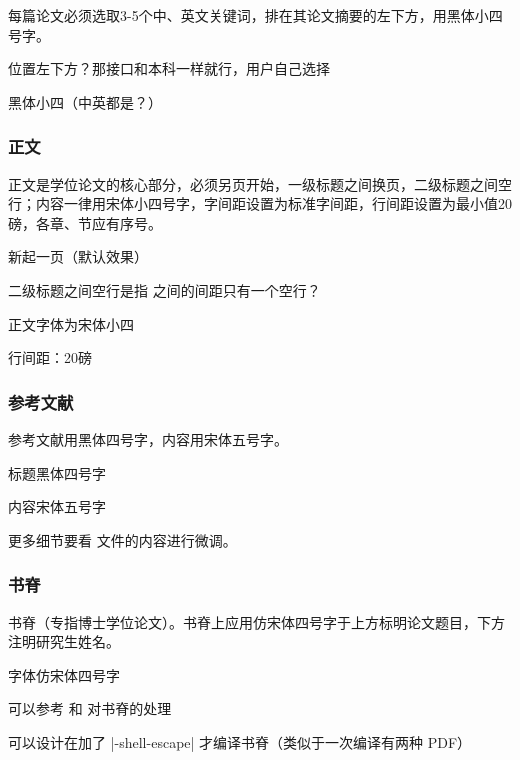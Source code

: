 \begin{reference}
  每篇论文必须选取3-5个中、英文关键词，排在其论文摘要的左下方，用黑体小四号字。
\end{reference}

\begin{points}
  \item 位置左下方？那接口和本科一样就行，用户自己选择
  \item 黑体小四（中英都是？）
\end{points}


\subsubsection{正文}


\begin{reference}
  正文是学位论文的核心部分，必须另页开始，一级标题之间换页，二级标题之间空行；内容一律用宋体小四号字，字间距设置为标准字间距，行间距设置为最小值20磅，各章、节应有序号。
\end{reference}

\begin{points}
  \item {} 新起一页（默认效果）
  \item 二级标题之间空行是指  之间的间距只有一个空行？
  \item 正文字体为宋体小四
  \item 行间距：20磅
\end{points}


\subsubsection{参考文献}

\begin{reference}
  参考文献用黑体四号字，内容用宋体五号字。
\end{reference}

\begin{points}
  \item 标题黑体四号字
  \item 内容宋体五号字
\end{points}

更多细节要看  文件的内容进行微调。


\subsubsection{书脊}

\begin{reference}
  书脊（专指博士学位论文）。书脊上应用仿宋体四号字于上方标明论文题目，下方注明研究生姓名。
\end{reference}

\begin{points}
  \item 字体仿宋体四号字
  \item 可以参考  和  对书脊的处理
  \item 可以设计在加了 |-shell-escape| 才编译书脊（类似于一次编译有两种 PDF）
\end{points}